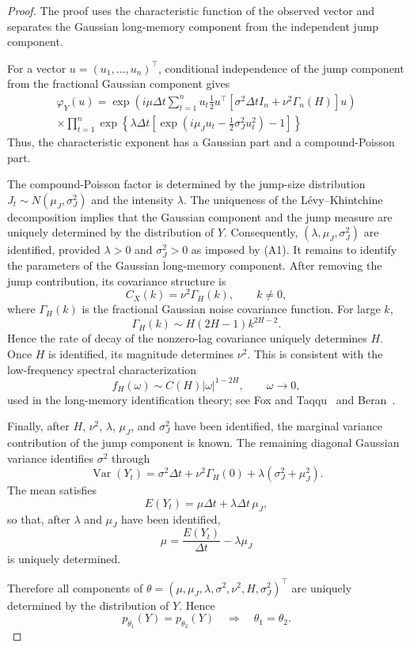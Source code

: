 \documentclass[a4paper,11pt]{amsart}
\theoremstyle{definition}
\theoremstyle{plain}
\theoremstyle{remark}
\newcommand{\1}{\mathbf{1}}
\begin{document}
\begin{proof}
The proof uses the characteristic function of the observed vector and separates the Gaussian long-memory component from the independent jump component.

For a vector $u=(u_1,\ldots,u_n)^\top$, conditional independence of the jump component from the fractional Gaussian component gives
\begin{align*}
\varphi_Y(u)
=
\exp\left(i\mu\Delta t\sum_{t=1}^n u_t\frac12u^\top\left[\sigma^2\Delta t I_n+\nu^2\Gamma_n(H)
\right]u
\right) \\
\times\prod_{t=1}^n
\exp\left\{
\lambda\Delta t
\left[
\exp\left(
i\mu_Ju_t-\frac12\sigma_J^2u_t^2
\right)-1
\right]
\right\}
\end{align*}
Thus, the characteristic exponent has a Gaussian part and a compound-Poisson part.

The compound-Poisson factor is determined by the jump-size distribution $J_t\sim N(\mu_J,\sigma_J^2)$ and the intensity $\lambda$. The uniqueness of the Lévy--Khintchine decomposition implies that the Gaussian component and the jump measure are uniquely determined by the distribution of $Y$. Consequently, $ (\lambda,\mu_J,\sigma_J^2)$ are identified, provided $\lambda>0$ and $\sigma_J^2>0$ as imposed by (A1).
It remains to identify the parameters of the Gaussian long-memory component. After removing the jump contribution, its covariance structure is
$$
C_X(k) = \nu^2\Gamma_H(k), \qquad k\neq0,
$$
where $\Gamma_H(k)$ is the fractional Gaussian noise covariance function. For large $k$,
$$
\Gamma_H(k) \sim H(2H-1)k^{2H-2}.
$$
Hence the rate of decay of the nonzero-lag covariance uniquely determines $H$. Once $H$ is identified, its magnitude determines $\nu^2$. This is consistent with the low-frequency spectral characterization
$$
f_H(\omega)
\sim
C(H)|\omega|^{1-2H},
\qquad
\omega\to0,
$$
used in the long-memory identification theory; see Fox and Taqqu~\cite{FoxTaqqu1986} and Beran~\cite{Beran1994}.

Finally, after $H$, $\nu^2$, $\lambda$, $\mu_J$, and $\sigma_J^2$ have been identified, the marginal variance contribution of the jump component is known. The remaining diagonal Gaussian variance identifies $\sigma^2$ through
$$
\operatorname{Var}(Y_t)
=
\sigma^2\Delta t
+
\nu^2\Gamma_H(0)
+
\lambda(\sigma_J^2+\mu_J^2).
$$
The mean satisfies
$$
E(Y_t)
=
\mu\Delta t+\lambda\Delta t\,\mu_J,
$$
so that, after $\lambda$ and $\mu_J$ have been identified,
$$
\mu
=
\frac{E(Y_t)}{\Delta t}
-
\lambda\mu_J
$$
is uniquely determined.

Therefore all components of
$
\theta=
(\mu,\mu_J,\lambda,\sigma^2,\nu^2,H,\sigma_J^2)^\top
$
are uniquely determined by the distribution of $Y$. Hence
$$
p_{\theta_1}(Y)=p_{\theta_2}(Y)
\quad\Longrightarrow\quad
\theta_1=\theta_2.
$$
\end{proof}
\end{document}
